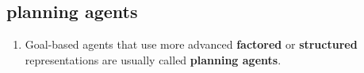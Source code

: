 \subsection{planning agents \cite{aci-1}}

\begin{enumerate}
    \item Goal-based agents that use more advanced \textbf{factored} or \textbf{structured} representations are usually called \textbf{planning agents}.


\end{enumerate}






































































